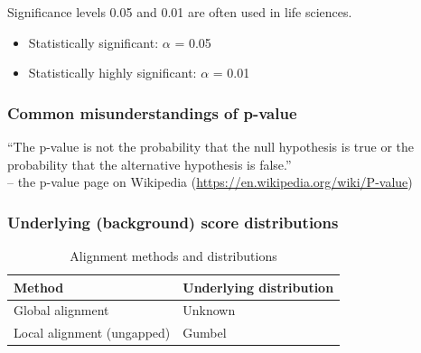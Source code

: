 \noindent
Significance levels 0.05 and 0.01 are often used in life sciences.
\begin{itemize}
\item Statistically significant: $\alpha$ = 0.05
\item Statistically highly significant: $\alpha$ = 0.01
\end{itemize}

%
%
\subsubsection*{Common misunderstandings of p-value} 
``The p-value is not the probability that the null hypothesis is true or the probability that the alternative hypothesis is false.'' \\

\noindent
-- the p-value page on Wikipedia (\url{https://en.wikipedia.org/wiki/P-value})

%
%
\subsubsection*{Underlying (background) score distributions} 
\begin{table}[H]
\centering
\caption{Alignment methods and distributions}
\begin{tabular}{ll}
Method                     & Underlying distribution \\ \hline
Global alignment           & Unknown                 \\
Local alignment (ungapped) & Gumbel                 
\end{tabular}
\end{table}

\bigskip 

%
